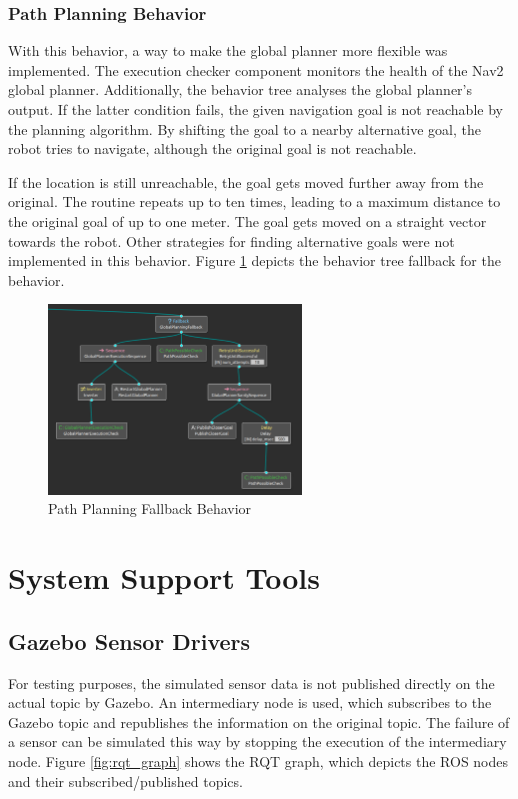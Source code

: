 \subsubsection{Path Planning Behavior}

With this behavior, a way to make the global planner more flexible was implemented. The execution checker component monitors the health of the Nav2 global planner. Additionally, the behavior tree analyses the global planner's output. If the latter condition fails, the given navigation goal is not reachable by the planning algorithm. By shifting the goal to a nearby alternative goal, the robot tries to navigate, although the original goal is not reachable. 

If the location is still unreachable, the goal gets moved further away from the original. The routine repeats up to ten times, leading to a maximum distance to the original goal of up to one meter. The goal gets moved on a straight vector towards the robot. Other strategies for finding alternative goals were not implemented in this behavior. Figure \ref{fig:global_planning_fallback} depicts the behavior tree fallback for the behavior.

\begin{figure}[ht]
	\centering
	\includegraphics[width=0.6\textwidth]{images/global_planning_fallback.png}
	\caption{Path Planning Fallback Behavior}
	\label{fig:global_planning_fallback}
\end{figure}

\section{System Support Tools}
\subsection{Gazebo Sensor Drivers}
\label{subsec:gazebo_driver}

For testing purposes, the simulated sensor data is not published directly on the actual topic by Gazebo. An intermediary node is used, which subscribes to the Gazebo topic and republishes the information on the original topic. The failure of a sensor can be simulated this way by stopping the execution of the intermediary node. Figure \ref{fig:rqt_graph} shows the RQT graph, which depicts the ROS nodes and their subscribed/published topics. 

